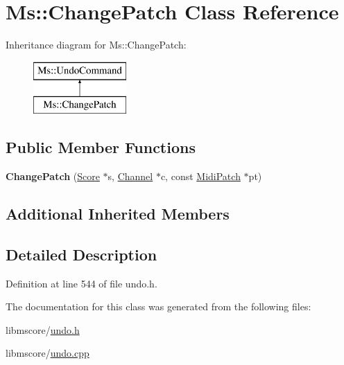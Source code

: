 \hypertarget{class_ms_1_1_change_patch}{}\section{Ms\+:\+:Change\+Patch Class Reference}
\label{class_ms_1_1_change_patch}
Inheritance diagram for Ms\+:\+:Change\+Patch\+:\begin{figure}[H]
\begin{center}
\leavevmode
\includegraphics[height=2.000000cm]{class_ms_1_1_change_patch}
\end{center}
\end{figure}
\subsection*{Public Member Functions}
\begin{DoxyCompactItemize}
\item 
\mbox{\label{class_ms_1_1_change_patch_a7757a5679a8c156b5e82138eb4284aeb}} 
{\bfseries Change\+Patch} (\hyperlink{class_ms_1_1_score}{Score} $\ast$s, \hyperlink{struct_ms_1_1_channel}{Channel} $\ast$c, const \hyperlink{struct_ms_1_1_midi_patch}{Midi\+Patch} $\ast$pt)
\end{DoxyCompactItemize}
\subsection*{Additional Inherited Members}


\subsection{Detailed Description}


Definition at line 544 of file undo.\+h.



The documentation for this class was generated from the following files\+:\begin{DoxyCompactItemize}
\item 
libmscore/\hyperlink{undo_8h}{undo.\+h}\item 
libmscore/\hyperlink{undo_8cpp}{undo.\+cpp}\end{DoxyCompactItemize}
